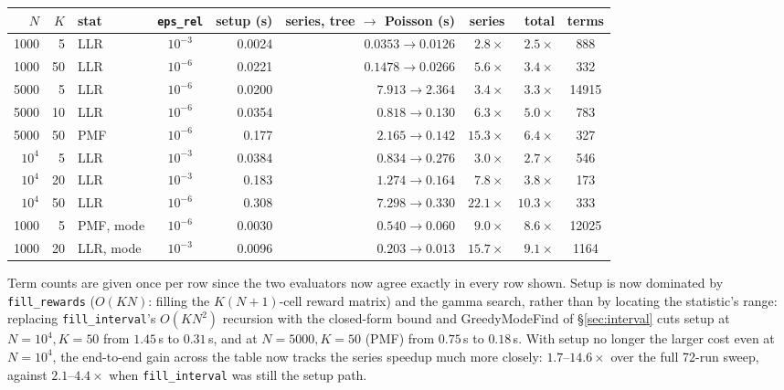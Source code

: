 \documentclass[11pt]{article}
\begin{document}
\begin{center}
\small
\begin{tabular}{rrlcrrrrc}
\toprule
$N$ & $K$ & stat & \texttt{eps\_rel} & setup (s) & series, tree $\to$ Poisson (s) & series & total & terms \\
\midrule
1000   & 5  & LLR & $10^{-3}$ & 0.0024 & $0.0353\to0.0126$  & $2.8\times$  & $2.5\times$  & 888 \\
1000   & 50 & LLR & $10^{-6}$ & 0.0221 & $0.1478\to0.0266$  & $5.6\times$  & $3.4\times$  & 332 \\
5000   & 5  & LLR & $10^{-6}$ & 0.0200 & $7.913\to2.364$    & $3.4\times$  & $3.3\times$  & 14915 \\
5000   & 10 & LLR & $10^{-6}$ & 0.0354 & $0.818\to0.130$    & $6.3\times$  & $5.0\times$  & 783 \\
5000   & 50 & PMF & $10^{-6}$ & 0.177  & $2.165\to0.142$    & $15.3\times$ & $6.4\times$  & 327 \\
$10^4$ & 5  & LLR & $10^{-3}$ & 0.0384 & $0.834\to0.276$    & $3.0\times$  & $2.7\times$  & 546 \\
$10^4$ & 20 & LLR & $10^{-3}$ & 0.183  & $1.274\to0.164$    & $7.8\times$  & $3.8\times$  & 173 \\
$10^4$ & 50 & LLR & $10^{-6}$ & 0.308  & $7.298\to0.330$    & $22.1\times$ & $10.3\times$ & 333 \\
\midrule
1000   & 5  & PMF, mode & $10^{-6}$ & 0.0030 & $0.540\to0.060$  & $9.0\times$  & $8.6\times$  & 12025 \\
1000   & 20 & LLR, mode & $10^{-3}$ & 0.0096 & $0.203\to0.013$  & $15.7\times$ & $9.1\times$  & 1164 \\
\bottomrule
\end{tabular}
\end{center}

Term counts are given once per row since the two evaluators now agree exactly in every row shown.
Setup is now dominated by \texttt{fill\_rewards} ($O(KN)$: filling the $K(N{+}1)$-cell reward
matrix) and the gamma search, rather than by locating the statistic's range: replacing
\texttt{fill\_interval}'s $O(KN^2)$ recursion with the closed-form bound and GreedyModeFind of
\S\ref{sec:interval} cuts setup at $N=10^4,K=50$ from $1.45$\,s to $0.31$\,s, and at
$N=5000,K=50$ (PMF) from $0.75$\,s to $0.18$\,s. With setup no longer the larger cost even at
$N=10^4$, the end-to-end gain across the table now tracks the series speedup much more closely:
$1.7$--$14.6\times$ over the full 72-run sweep, against $2.1$--$4.4\times$ when \texttt{fill\_interval}
was still the setup path.
\end{document}
